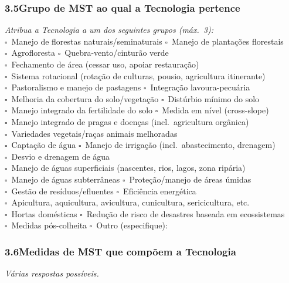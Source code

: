 \subsubsection*{3.5\quad Grupo de MST ao qual a Tecnologia pertence}
\textit{Atribua a Tecnologia a um dos seguintes grupos (máx.\ 3):}\\[4pt]
$\square$~Manejo de florestas naturais/seminaturais \quad $\square$~Manejo de plantações florestais\\
$\square$~Agrofloresta \quad $\square$~Quebra-vento/cinturão verde\\
$\square$~Fechamento de área (cessar uso, apoiar restauração)\\
$\square$~Sistema rotacional (rotação de culturas, pousio, agricultura itinerante)\\
$\square$~Pastoralismo e manejo de pastagens \quad $\square$~Integração lavoura-pecuária\\
$\square$~Melhoria da cobertura do solo/vegetação \quad $\square$~Distúrbio mínimo do solo\\
$\square$~Manejo integrado da fertilidade do solo \quad $\square$~Medida em nível (cross-slope)\\
$\square$~Manejo integrado de pragas e doenças (incl.\ agricultura orgânica)\\
$\square$~Variedades vegetais/raças animais melhoradas\\
$\square$~Captação de água \quad $\square$~Manejo de irrigação (incl.\ abastecimento, drenagem)\\
$\square$~Desvio e drenagem de água\\
$\square$~Manejo de águas superficiais (nascentes, rios, lagos, zona ripária)\\
$\square$~Manejo de águas subterrâneas \quad $\square$~Proteção/manejo de áreas úmidas\\
$\square$~Gestão de resíduos/efluentes \quad $\square$~Eficiência energética\\
$\square$~Apicultura, aquicultura, avicultura, cunicultura, sericicultura, etc.\\
$\square$~Hortas domésticas \quad $\square$~Redução de risco de desastres baseada em ecossistemas\\
$\square$~Medidas pós-colheita \quad $\square$~Outro (especifique): \dotfill

\subsubsection*{3.6\quad Medidas de MST que compõem a Tecnologia}
\textit{Várias respostas possíveis.}


